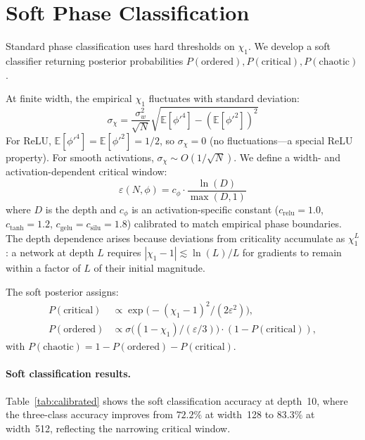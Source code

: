\documentclass[10pt]{article}
\newcommand{\EE}{\mathbb{E}}
\begin{document}
\section{Soft Phase Classification}
\label{sec:calibrated}

Standard phase classification uses hard thresholds on $\chi_1$.
We develop a soft classifier returning posterior probabilities $P(\text{ordered}), P(\text{critical}), P(\text{chaotic})$.

At finite width, the empirical $\chi_1$ fluctuates with standard deviation:
\begin{equation}
    \sigma_\chi = \frac{\sigma_w^2}{\sqrt{N}}\sqrt{\EE[\phi'^4] - (\EE[\phi'^2])^2}
    \label{eq:chi1-fluctuation}
\end{equation}
For ReLU, $\EE[\phi'^4] = \EE[\phi'^2] = 1/2$, so $\sigma_\chi = 0$ (no fluctuations---a special ReLU property).
For smooth activations, $\sigma_\chi \sim O(1/\sqrt{N})$.
We define a width- and activation-dependent critical window:
\begin{equation}
    \varepsilon(N, \phi) = c_\phi \cdot \frac{\ln(D)}{\max(D,1)}
    \label{eq:critical-window}
\end{equation}
where $D$ is the depth and $c_\phi$ is an activation-specific constant ($c_{\text{relu}} = 1.0$, $c_{\text{tanh}} = 1.2$, $c_{\text{gelu}} = c_{\text{silu}} = 1.8$) calibrated to match empirical phase boundaries.
The depth dependence arises because deviations from criticality accumulate as $\chi_1^L$: a network at depth $L$ requires $|\chi_1 - 1| \lesssim \ln(L)/L$ for gradients to remain within a factor of $L$ of their initial magnitude.

The soft posterior assigns:
\begin{align}
    P(\text{critical}) &\propto \exp\!\bigl(-(\chi_1 - 1)^2/(2\varepsilon^2)\bigr), \label{eq:p-critical} \\
    P(\text{ordered}) &\propto \sigma\!\bigl((1 - \chi_1)/(\varepsilon/3)\bigr) \cdot (1 - P(\text{critical})), \label{eq:p-ordered}
\end{align}
with $P(\text{chaotic}) = 1 - P(\text{ordered}) - P(\text{critical})$.

\paragraph{Soft classification results.}
Table~\ref{tab:calibrated} shows the soft classification accuracy at depth~10, where the three-class accuracy improves from $72.2\%$ at width~128 to $83.3\%$ at width~512, reflecting the narrowing critical window.
\end{document}
